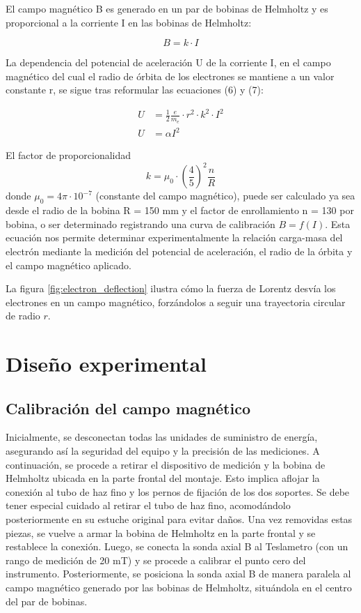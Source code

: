 \documentclass[twocolumn,a4paper,11pt]{scrartcl}
\begin{document}
El campo magnético B es generado en un par de bobinas de Helmholtz y es proporcional a la corriente I en las bobinas de Helmholtz:

\begin{equation}
B = k \cdot I
\end{equation}

La dependencia del potencial de aceleración U de la corriente I, en el campo magnético del cual el radio de órbita de los electrones se mantiene a un valor constante r, se sigue tras reformular las ecuaciones (6) y (7):

\begin{equation}
    \begin{aligned}
U &= \frac{1}{2}\frac{e}{m_e} \cdot r^2 \cdot k^2 \cdot I^2 \\
U &= \alpha I^2
    \end{aligned}
\end{equation}

El factor de proporcionalidad
\begin{equation}
k = \mu_0 \cdot \left(\frac{4}{5}\right)^2 \frac{n}{R}
\end{equation}
donde $\mu_0 = 4\pi \cdot 10^{-7}$ (constante del campo magnético),
puede ser calculado ya sea desde el radio de la bobina R = 150 mm y el factor de enrollamiento n = 130 por bobina, o ser determinado registrando una curva de calibración $B = f(I)$. Esta ecuación nos permite determinar experimentalmente la relación carga-masa del electrón mediante la medición del potencial de aceleración, el radio de la órbita y el campo magnético aplicado.

La figura \ref{fig:electron_deflection} ilustra cómo la fuerza de Lorentz desvía los electrones en un campo magnético, forzándolos a seguir una trayectoria circular de radio $r$.

\section{Diseño experimental}




\subsection*{Calibración del campo magnético}
Inicialmente, se desconectan todas las unidades de suministro de energía, asegurando así la seguridad del equipo y la precisión de las mediciones. A continuación, se procede a retirar el dispositivo de medición y la bobina de Helmholtz ubicada en la parte frontal del montaje. Esto implica aflojar la conexión al tubo de haz fino y los pernos de fijación de los dos soportes. Se debe tener especial cuidado al retirar el tubo de haz fino, acomodándolo posteriormente en su estuche original para evitar daños. Una vez removidas estas piezas, se vuelve a armar la bobina de Helmholtz en la parte frontal y se restablece la conexión. 
Luego, se conecta la sonda axial B al Teslametro (con un rango de medición de 20 mT) y se procede a calibrar el punto cero del instrumento. Posteriormente, se posiciona la sonda axial B de manera paralela al campo magnético generado por las bobinas de Helmholtz, situándola en el centro del par de bobinas. 
\end{document}
